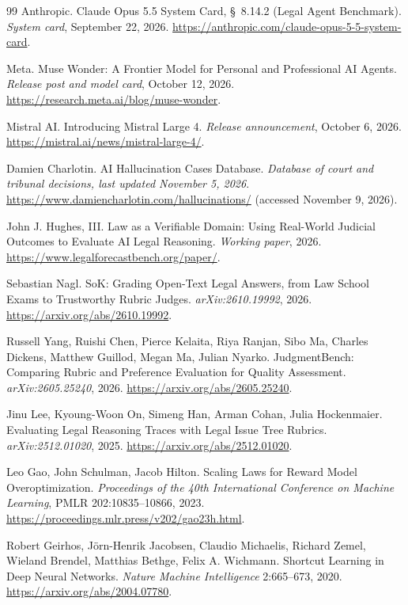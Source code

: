 \documentclass[11pt]{article}
\begin{document}
\begin{thebibliography}{99}
 Anthropic. Claude Opus 5.5 System Card, \S~8.14.2 (Legal Agent Benchmark). \emph{System card}, September 22, 2026. \url{https://anthropic.com/claude-opus-5-5-system-card}.

 Meta. Muse Wonder: A Frontier Model for Personal and Professional AI Agents. \emph{Release post and model card}, October 12, 2026. \url{https://research.meta.ai/blog/muse-wonder}.

 Mistral AI. Introducing Mistral Large 4. \emph{Release announcement}, October 6, 2026. \url{https://mistral.ai/news/mistral-large-4/}.

 Damien Charlotin. AI Hallucination Cases Database. \emph{Database of court and tribunal decisions, last updated November 5, 2026}. \url{https://www.damiencharlotin.com/hallucinations/} (accessed November 9, 2026).

 John J. Hughes, III. Law as a Verifiable Domain: Using Real-World Judicial Outcomes to Evaluate AI Legal Reasoning. \emph{Working paper}, 2026. \url{https://www.legalforecastbench.org/paper/}.

 Sebastian Nagl. SoK: Grading Open-Text Legal Answers, from Law School Exams to Trustworthy Rubric Judges. \emph{arXiv:2610.19992}, 2026. \url{https://arxiv.org/abs/2610.19992}.

 Russell Yang, Ruishi Chen, Pierce Kelaita, Riya Ranjan, Sibo Ma, Charles Dickens, Matthew Guillod, Megan Ma, Julian Nyarko. JudgmentBench: Comparing Rubric and Preference Evaluation for Quality Assessment. \emph{arXiv:2605.25240}, 2026. \url{https://arxiv.org/abs/2605.25240}.

 Jinu Lee, Kyoung-Woon On, Simeng Han, Arman Cohan, Julia Hockenmaier. Evaluating Legal Reasoning Traces with Legal Issue Tree Rubrics. \emph{arXiv:2512.01020}, 2025. \url{https://arxiv.org/abs/2512.01020}.

 Leo Gao, John Schulman, Jacob Hilton. Scaling Laws for Reward Model Overoptimization. \emph{Proceedings of the 40th International Conference on Machine Learning}, PMLR 202:10835--10866, 2023. \url{https://proceedings.mlr.press/v202/gao23h.html}.

 Robert Geirhos, J\"orn-Henrik Jacobsen, Claudio Michaelis, Richard Zemel, Wieland Brendel, Matthias Bethge, Felix A. Wichmann. Shortcut Learning in Deep Neural Networks. \emph{Nature Machine Intelligence} 2:665--673, 2020. \url{https://arxiv.org/abs/2004.07780}.


\end{thebibliography}
\end{document}
